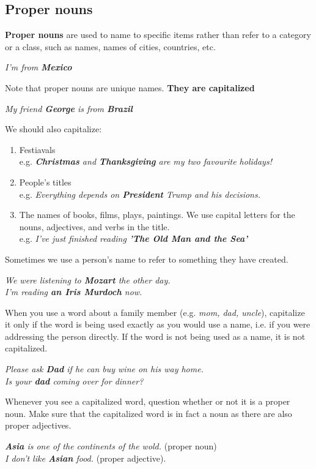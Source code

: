 \documentclass[10pt,a4paper]{article}
\begin{document}
\subsection{Proper nouns}
\textbf{Proper nouns} are used to name to specific items rather than refer to a category or a class, such as names, names of cities, countries, etc.
\begin{center}
		\textit{I'm from \textbf{Mexico} }
\end{center}
Note that proper nouns are unique names. \textbf{They are capitalized}
\begin{center}
	\textit{My friend \textbf{George} is from \textbf{Brazil}  }
\end{center}
We should also capitalize:
\begin{enumerate}[label=\alph*)]
		\item Festiavals\\
				e.g. \textit{\textbf{Christmas} and \textbf{Thanksgiving} are my two favourite holidays!}
		\item People's titles\\
				e.g. \textit{Everything depends on \textbf{President} Trump and his decisions.}
		\item The names of books, films, plays, paintings. We use capital letters for the nouns, adjectives, and verbs in the title.\\
				e.g. \textit{I've just finished reading \textbf{'The Old Man and the Sea'}}
\end{enumerate}
Sometimes we use a person's name to refer to something they have created.
\begin{center}
\textit{We were listening to \textbf{Mozart} the other day.}\\
\textit{I'm reading \textbf{an Iris Murdoch} now.}
\end{center}

When you use a word about a family member (e.g. \textit{mom, dad, uncle}), capitalize it only if the word is being used exactly as you would use a name, i.e. if you were addressing the person directly. If the word is not being used as a name, it is not capitalized.
\begin{center}
		\textit{Please ask \textbf{Dad} if he can buy wine on his way home.}\\
		\textit{Is your \textbf{dad} coming over for dinner?}
\end{center}
Whenever you see a capitalized word, question whether or not it is a proper noun. Make sure that the capitalized word is in fact a noun as there are also proper adjectives.
\begin{center}
		\textit{ \textbf{Asia} is one of the continents of the wold.} (proper noun)\\
		\textit{I don't like \textbf{Asian} food.} (proper adjective).
\end{center}
\end{document}
